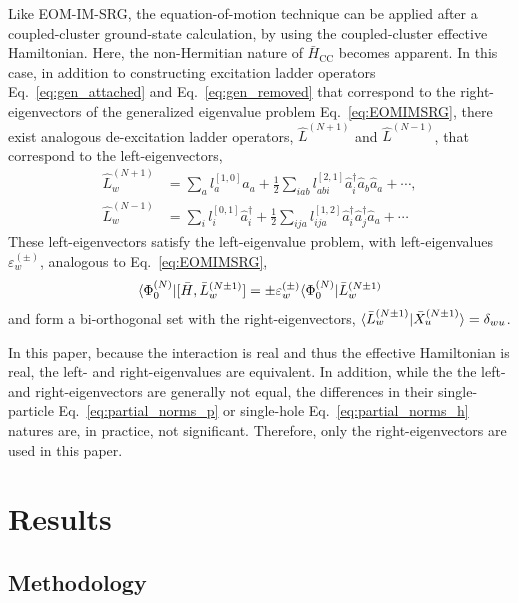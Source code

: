 Like EOM-IM-SRG, the equation-of-motion technique can be applied after a coupled-cluster ground-state calculation, by using the coupled-cluster effective Hamiltonian.  Here, the non-Hermitian nature of $\bar{H}_{\mathrm{CC}}$ becomes apparent.  In this case, in addition to constructing excitation ladder operators Eq.\ \eqref{eq:gen_attached} and Eq.\ \eqref{eq:gen_removed} that correspond to the right-eigenvectors of the generalized eigenvalue problem Eq.\ \eqref{eq:EOMIMSRG}, there exist analogous de-excitation ladder operators, $\hat{L}^{(N + 1)}$ and $\hat{L}^{(N - 1)}$, that correspond to the left-eigenvectors,
\begin{align*}
    \hat{L}^{(N + 1)}_w &= \sum_a l^{[1, 0]}_a \hat{a}_a^{} + \frac{1}{2} \sum_{i a b} l^{[2, 1]}_{a b i} \hat{a}^\dagger_i \hat{a}_b^{} \hat{a}_a^{} + \cdots, \\
    \hat{L}^{(N - 1)}_w &= \sum_i l_i^{[0, 1]} \hat{a}^\dagger_i + \frac{1}{2} \sum_{i j a} l^{[1, 2]}_{i j a} \hat{a}^\dagger_i \hat{a}^\dagger_j \hat{a}_a^{} + \cdots
\end{align*}
These left-eigenvectors satisfy the left-eigenvalue problem, with left-eigenvalues $\varepsilon^{(\pm)}_w$, analogous to Eq.\ \eqref{eq:EOMIMSRG},
\begin{align*}
  \langle \Phi^{(N)}_0 | [\bar{H}, \bar{L}^{(N \pm 1)}_w] = \pm \varepsilon^{(\pm)}_w \langle \Phi^{(N)}_0 | \bar{L}^{(N \pm 1)}_w
\end{align*}
and form a bi-orthogonal set with the right-eigenvectors, $\langle \bar{L}^{(N \pm 1)}_w | \bar{X}^{(N \pm 1)}_u\rangle = \delta_{w u}$.

In this paper, because the interaction is real and thus the effective Hamiltonian is real, the left- and right-eigenvalues are equivalent. In addition, while the the left- and right-eigenvectors are generally not equal, the differences in their single-particle Eq.\ \eqref{eq:partial_norms_p} or single-hole Eq.\ \eqref{eq:partial_norms_h} natures are, in practice, not significant.  Therefore, only the right-eigenvectors are used in this paper.

\section{Results}
\label{sec:results}

\subsection{Methodology}
\label{subsec:methodology}

